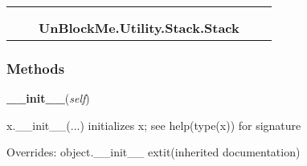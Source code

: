     \label{UnBlockMe:Utility:Stack:Stack}
\begin{tabular}{cccccc}
\multicolumn{2}{r}{\settowidth{\BCL}{object}\multirow{2}{\BCL}{object}}
&&
  \\\cline{3-3}
  &&\multicolumn{1}{c|}{}
&&
  \\
&&\multicolumn{2}{l}{\textbf{UnBlockMe.Utility.Stack.Stack}}
\end{tabular}



  \subsubsection{Methods}

    \vspace{0.5ex}

\hspace{.8\funcindent}\begin{boxedminipage}{\funcwidth}

    \raggedright \textbf{\_\_init\_\_}(\textit{self})

\setlength{\parskip}{2ex}
    x.\_\_init\_\_(...) initializes x; see help(type(x)) for signature

\setlength{\parskip}{1ex}
      Overrides: object.\_\_init\_\_ 	extit{(inherited documentation)}

    \end{boxedminipage}

    \label{UnBlockMe:Utility:Stack:Stack:put}

    \vspace{0.5ex}

